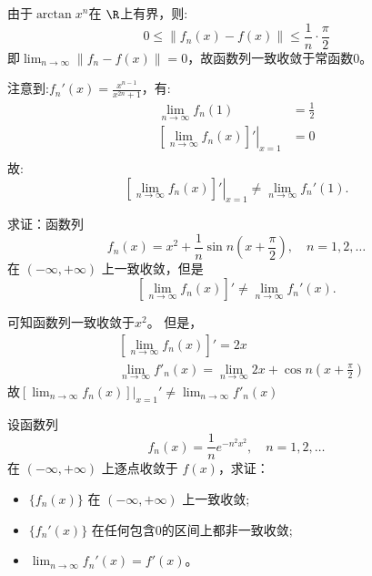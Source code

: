 \begin{solution}
    由于\(\arctan x^{n}\)在 \(\R\)上有界，则:
    \[
        0 \le  \left\lVert f_{n}(x) - f(x) \right\rVert \le
        \frac{1}{n} \cdot \frac{\pi}{2}
    \]
    即\(\lim_{n \to \infty} \left\lVert f_{n} - f(x) \right\rVert =
    0\)，故函数列一致收敛于常函数\(0\)。

    注意到:\(f_{n}'(x) = \frac{x^{n - 1}}{x^{2n} + 1}\)，有:
    \begin{align*}
        \lim_{n \to \infty} f_{n}(1) & = \frac{1}{2} \\
        \left. \left[ \lim_{n \to \infty} f_{n}(x) \right]'
        \right|_{x=1}                & = 0           \\
    \end{align*}
    故: \[
        \left. \left[ \lim_{n \to \infty} f_n(x) \right]'
        \right|_{x = 1}
        \neq \lim_{n \to \infty} f_n'(1).
    \]
\end{solution}

\begin{problem}
    求证：函数列
    \[
        f_n(x) = x^2 + \frac{1}{n} \sin n \left( x + \frac{\pi}{2}
        \right), \quad n = 1, 2, \dots
    \]
    在 \((-\infty, +\infty)\) 上一致收敛，但是
    \[
        \left[ \lim_{n \to \infty} f_n(x) \right]' \neq \lim_{n \to
        \infty} f_n'(x).
    \]
\end{problem}

\begin{solution}
    可知函数列一致收敛于\(x^{2}\)。
    但是，
    \begin{align*}
        & \left[ \lim_{n \to \infty} f_{n}(x) \right]' = 2x        \\
        & \lim_{n \to \infty} f'_{n}(x) = \lim_{n \to \infty} 2x +
        \cos n \left( x + \frac{\pi}{2} \right)
    \end{align*}
    故\(\left.\left[ \lim_{n \to \infty} f_n(x) \right]\right|_{x=1}'
        \neq \lim_{n \to
    \infty} f'_{n}(x)\)
\end{solution}

\begin{problem}
    设函数列
    \[
        f_n(x) = \frac{1}{n} e^{-n^2 x^2}, \quad n = 1, 2, \dots
    \]
    在 \((-\infty, +\infty)\) 上逐点收敛于 \(f(x)\)，求证：
    \begin{itemize}
        \item \(\{f_n(x)\}\) 在 \((-\infty, +\infty)\) 上一致收敛;
        \item \(\{f_n'(x)\}\) 在任何包含0的区间上都非一致收敛;
        \item \(\lim_{n \to \infty} f_n'(x) = f'(x)\)。
    \end{itemize}
\end{problem}

